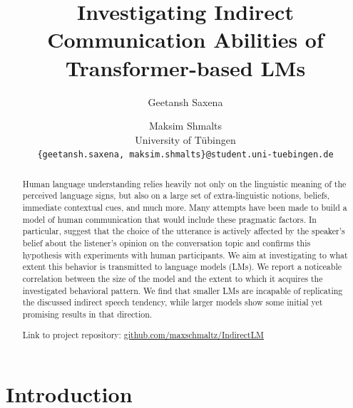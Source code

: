 \documentclass[11pt]{article}
\title{Investigating Indirect Communication Abilities of Transformer-based LMs}
\author{Geetansh Saxena \and Maksim Shmalts \\
        University of Tübingen \\
        \texttt{\{geetansh.saxena, maksim.shmalts\}@student.uni-tuebingen.de}}
\begin{document}
\maketitle


\begin{abstract}
Human language understanding relies heavily not only on the linguistic meaning of the perceived language signs, but also on a large set of extra-linguistic notions, beliefs, immediate contextual cues, and much more. Many attempts have been made to build a model of human communication that would include these pragmatic factors. In particular, \citet{achimova-2025} suggest that the choice of the utterance is actively affected by the speaker’s belief about the listener’s opinion on the conversation topic and confirms this hypothesis with experiments with human participants. We aim at investigating to what extent this behavior is transmitted to language models (LMs). We report a noticeable correlation between the size of the model and the extent to which it acquires the investigated behavioral pattern. We find that smaller LMs are incapable of replicating the discussed indirect speech tendency, while larger models show some initial yet promising results in that direction.

Link to project repository: \href{https://github.com/maxschmaltz/IndirectLM}{github.com/maxschmaltz/IndirectLM}
\end{abstract}


\section{Introduction}
\label{sec:intro}
\end{document}
